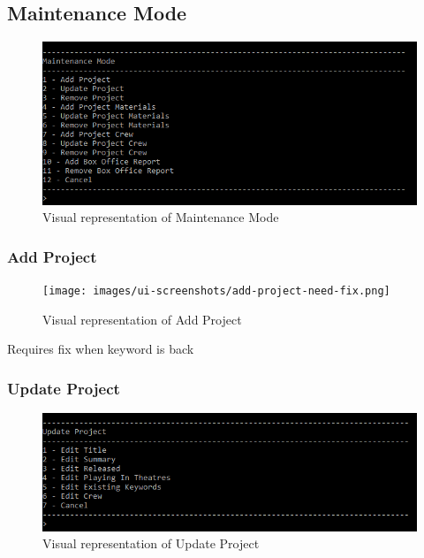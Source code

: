 \documentclass[
  english,
  a4paper,
,tablecaptionabove
]{scrartcl}
\begin{document}
\newpage

\hypertarget{maintenance-mode}{%
\subsection{Maintenance Mode}\label{maintenance-mode}}

\begin{figure}
\centering
\includegraphics{images/ui-screenshots/maintenance-mode.png}
\caption{Visual representation of Maintenance Mode}
\end{figure}

\hypertarget{add-project}{%
\subsubsection{Add Project}\label{add-project}}

\begin{figure}
\centering
\texttt{[image: images/ui-screenshots/add-project-need-fix.png]}
\caption{Visual representation of Add Project}
\end{figure}

Requires fix when keyword is back

\newpage

\hypertarget{update-project}{%
\subsubsection{Update Project}\label{update-project}}

\begin{figure}
\centering
\includegraphics{images/ui-screenshots/update-project.png}
\caption{Visual representation of Update Project}
\end{figure}
\end{document}
